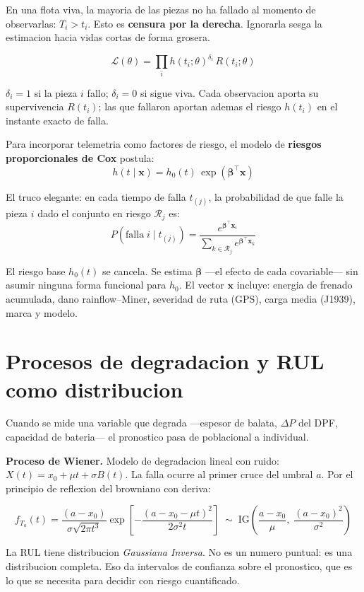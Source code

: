 \documentclass[10.5pt,a4paper]{article}
\begin{document}
En una flota viva, la mayoria de las piezas no ha fallado al momento de observarlas: $T_i > t_i$. Esto es \textbf{censura por la derecha}. Ignorarla sesga la estimacion hacia vidas cortas de forma grosera.

\begin{mathbox}
$$\mathcal{L}(\theta) = \prod_i h(t_i;\theta)^{\delta_i}\,R(t_i;\theta)$$

$\delta_i = 1$ si la pieza $i$ fallo; $\delta_i = 0$ si sigue viva. Cada observacion aporta su supervivencia $R(t_i)$; las que fallaron aportan ademas el riesgo $h(t_i)$ en el instante exacto de falla.
\end{mathbox}

Para incorporar telemetria como factores de riesgo, el modelo de \textbf{riesgos proporcionales de Cox} postula:
$$h(t \mid \mathbf{x}) = h_0(t)\,\exp(\boldsymbol\beta^\top\mathbf{x})$$

El truco elegante: en cada tiempo de falla $t_{(j)}$, la probabilidad de que falle la pieza $i$ dado el conjunto en riesgo $\mathcal{R}_j$ es:
$$P(\text{falla}\;i \mid t_{(j)}) = \frac{e^{\boldsymbol\beta^\top\mathbf{x}_i}}{\sum_{k\in\mathcal{R}_j}e^{\boldsymbol\beta^\top\mathbf{x}_k}}$$

El riesgo base $h_0(t)$ se cancela. Se estima $\boldsymbol\beta$ ---el efecto de cada covariable--- sin asumir ninguna forma funcional para $h_0$. El vector $\mathbf{x}$ incluye: energia de frenado acumulada, dano rainflow--Miner, severidad de ruta (GPS), carga media (J1939), marca y modelo.

\section{Procesos de degradacion y RUL como distribucion}

Cuando se mide una variable que degrada ---espesor de balata, $\Delta P$ del DPF, capacidad de bateria--- el pronostico pasa de poblacional a individual.

\textbf{Proceso de Wiener.} Modelo de degradacion lineal con ruido: $X(t) = x_0 + \mu t + \sigma B(t)$. La falla ocurre al primer cruce del umbral $a$. Por el principio de reflexion del browniano con deriva:

\begin{mathbox}
$$f_{T_a}(t) = \frac{(a-x_0)}{\sigma\sqrt{2\pi t^3}}\exp\!\left[-\frac{(a-x_0-\mu t)^2}{2\sigma^2 t}\right] \;\sim\; \mathrm{IG}\!\left(\frac{a-x_0}{\mu},\;\frac{(a-x_0)^2}{\sigma^2}\right)$$

La RUL tiene distribucion \textit{Gaussiana Inversa}. No es un numero puntual: es una distribucion completa. Eso da intervalos de confianza sobre el pronostico, que es lo que se necesita para decidir con riesgo cuantificado.
\end{mathbox}
\end{document}
